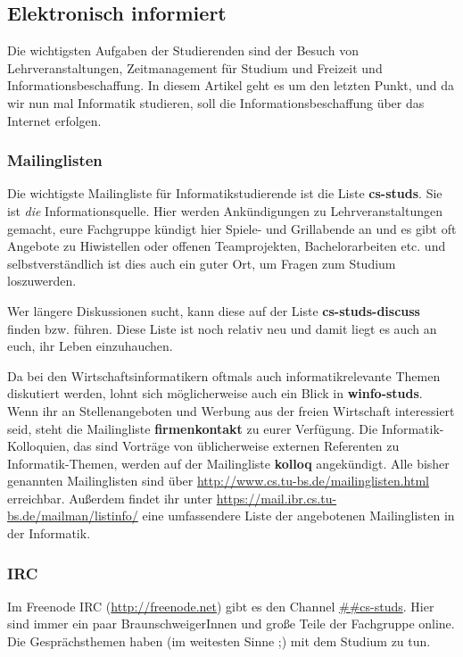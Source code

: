 \begin{multicols}{2}
\subsection{Elektronisch informiert}
	\label{elekinf}
	Die wichtigsten Aufgaben der Studierenden sind der Besuch von Lehrveranstaltungen, Zeitmanagement für Studium und Freizeit und Informationsbeschaffung. In diesem Artikel geht es um den letzten Punkt, und da wir nun mal Informatik studieren, soll die Informationsbeschaffung über das Internet erfolgen.

	\subsubsection*{Mailinglisten}
		Die wichtigste Mailingliste für Informatikstudierende ist die Liste \textbf{cs-studs}. Sie ist \emph{die} Informationsquelle. Hier werden Ankündigungen zu Lehrveranstaltungen gemacht, eure Fachgruppe kündigt hier Spiele- und Grillabende an und es gibt oft Angebote zu Hiwistellen oder offenen Teamprojekten, Bachelorarbeiten etc. und selbstverständlich ist dies auch ein guter Ort, um Fragen zum Studium loszuwerden.

		Wer längere Diskussionen sucht, kann diese auf der Liste \textbf{cs-studs-discuss} finden bzw. führen. Diese Liste ist noch relativ neu und damit liegt es auch an euch, ihr Leben einzuhauchen.

		Da bei den Wirtschaftsinformatikern oftmals auch informatikrelevante Themen diskutiert werden, lohnt sich möglicherweise auch ein Blick in \textbf{winfo-studs}. Wenn ihr an Stellenangeboten und Werbung aus der freien Wirtschaft interessiert seid, steht die Mailingliste \textbf{firmenkontakt} zu eurer Verfügung. Die Informatik-Kolloquien, das sind Vorträge von üblicherweise externen Referenten zu Informatik-Themen, werden auf der Mailingliste \textbf{kolloq} angekündigt. Alle bisher genannten Mailinglisten sind über \url{http://www.cs.tu-bs.de/mailinglisten.html} erreichbar. Außerdem findet ihr unter \url{https://mail.ibr.cs.tu-bs.de/mailman/listinfo/} eine umfassendere Liste der angebotenen Mailinglisten in der Informatik.

	\subsubsection*{IRC}
		Im Freenode IRC (\url{http://freenode.net}) gibt es den Channel \url{##cs-studs}. Hier sind immer ein paar BraunschweigerInnen und große Teile der Fachgruppe online. Die Gesprächsthemen haben (im weitesten Sinne ;) mit dem Studium zu tun.


\end{multicols}
